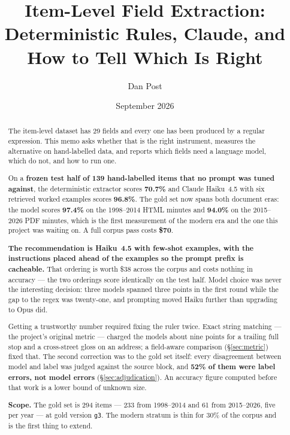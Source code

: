 \documentclass[11pt]{article}
\title{Item-Level Field Extraction:\\
Deterministic Rules, Claude, and How to Tell Which Is Right}
\author{Dan Post}
\date{September 2026}
\begin{document}
\maketitle

\begin{abstract}
\noindent
The item-level dataset has 29 fields and every one has been produced by a regular
expression. This memo asks whether that is the right instrument, measures the alternative on
hand-labelled data, and reports which fields need a language model, which do not, and how to
run one.

\medskip\noindent
On a \textbf{frozen test half of 139 hand-labelled items that no prompt was tuned against},
the deterministic extractor scores \textbf{70.7\%} and Claude Haiku~4.5 with six retrieved
worked examples scores \textbf{96.8\%}. The gold set now spans both document eras: the model
scores \textbf{97.4\%} on the 1998--2014 HTML minutes and \textbf{94.0\%} on the 2015--2026
PDF minutes, which is the first measurement of the modern era and the one this project was
waiting on. A full corpus pass costs \textbf{\$70}.

\medskip\noindent
\textbf{The recommendation is Haiku~4.5 with few-shot examples, with the instructions placed
ahead of the examples so the prompt prefix is cacheable.} That ordering is worth \$38 across
the corpus and costs nothing in accuracy --- the two orderings score identically on the test
half. Model choice was never the interesting decision: three models spanned three points in
the first round while the gap to the regex was twenty-one, and prompting moved Haiku further
than upgrading to Opus did.

\medskip\noindent
Getting a trustworthy number required fixing the ruler twice. Exact string matching --- the
project's original metric --- charged the models about nine points for a trailing full stop
and a cross-street gloss on an address; a field-aware comparison (\S\ref{sec:metric}) fixed
that. The second correction was to the gold set itself: every disagreement between model and
label was judged against the source block, and \textbf{52\% of them were label errors, not
model errors} (\S\ref{sec:adjudication}). An accuracy figure computed before that work is a
lower bound of unknown size.

\medskip\noindent
\textbf{Scope.} The gold set is 294 items --- 233 from 1998--2014 and 61 from 2015--2026,
five per year --- at gold version \texttt{g3}. The modern stratum is thin for 30\% of the
corpus and is the first thing to extend.
\end{abstract}
\end{document}
